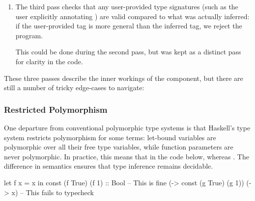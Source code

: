 \documentclass[dissertation.tex]{subfiles}
\begin{document}
{{\begin{enumerate}
{            This cannot be done efficiently during the first pass: consider the expression  where the \(t_i\) are type variables tagging the expressions. Assume we have inferred that  and \haskell{(+) :: #\(\beta\rightarrow\beta\rightarrow\beta\)#} as described above, and that we have unified \(t_1\) and \(t_2\) with these types respectively. Inferring the type of the overall expression would proceed by unifying the type of the first formal argument of the function (\(\beta\)) with the first actual argument (\(\alpha\)), and then using this substitution to type the return value of the function as \(\alpha\rightarrow\alpha\rightarrow\alpha\), which we can now unify with \(t_3\). Had we previously updated the subterm's tags to be their inferred concrete types we would now have to update them again: \(\beta\) is no longer used as it was unified with \(\alpha\), but our subterms may still contains uses of it.
        }
        \item
        {
            The third pass checks that any user-provided type signatures (such as the user explicitly annotating ) are valid compared to what was actually inferred: if the user-provided tag is more general than the inferred tag, we reject the program. 

            This could be done during the second pass, but was kept as a distinct pass for clarity in the code.
        }
        \end{enumerate}

        These three passes describe the inner workings of the component, but there are still a number of tricky edge-cases to navigate:

        \subsubsection{Restricted Polymorphism}
        {
            One departure from conventional polymorphic type systems is that Haskell's type system restricts polymorphism for some terms: let-bound variables are polymorphic over all their free type variables, while function parameters are never polymorphic. In practice, this means that in the code below,  whereas . The difference in semantics ensures that type inference remains decidable. 

            \begin{haskellfigure}
            let f x = x in const (f True) (f 1) :: Bool -- This is fine
            (\g -> const (g True) (g 1)) (\x -> x)      -- This fails to typecheck
            \end{haskellfigure}
        }
}}
\end{document}
